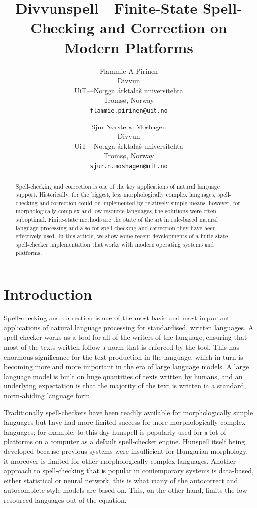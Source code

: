 \documentclass[free]{flammie}
\title{Divvunspell---Finite-State Spell-Checking and Correction on Modern Platforms}
\author{Flammie A Pirinen \\
  Divvun \\
  UiT---Norgga árktalaš universitehta \\
  Tromsø, Norway \\
  {\tt flammie.pirinen@uit.no} \\\and%
  Sjur Nørstebø Moshagen \\
  Divvun \\
  UiT---Norgga árktalaš universitehta \\
  Tromsø, Norway \\
  {\tt sjur.n.moshagen@uit.no}}
\date{}
\begin{document}
\maketitle
\begin{abstract}
    Spell-checking and correction is one of the key applications of natural
    language support.  Historically, for the biggest, less morphologically
    complex languages, spell-checking and correction could be implemented by
    relatively simple means; however, for morphologically complex and
    low-resource languages, the solutions were often suboptimal.  Finite-state
    methods are the state of the art in rule-based natural language processing
    and also for spell-checking and correction they have been effectively used.
    In this article, we show some recent developments of a finite-state
    spell-checker implementation that works with modern operating systems and
    platforms.
\end{abstract}



\section{Introduction}

Spell-checking and correction is one of the most basic and most important
applications of natural language processing for standardised, written languages.
A spell-checker works as a tool for all of the writers of the language, ensuring
that most of the texts written follow a norm that is enforced by the tool.  This
has enormous significance for the text production in the language, which in turn
is becoming more and more important in the era of large language models.  A
large language model is built on huge quantities of texts written by humans, and
an underlying expectation is that the majority of the text is written in a
standard, norm-abiding language form.

Traditionally spell-checkers have been readily available for morphologically
simple languages but have had more limited success for more morphologically
complex languages; for example, to this day hunspell is popularly used for a lot
of platforms on a computer as a default spell-checker engine. Hunspell itself
being developed because previous systems were insufficient for Hungarian
morphology, it moreover is limited for other morphologically complex languages.
Another approach to spell-checking that is popular in contemporary systems is
data-based, either statistical or neural network, this is what many of the
autocorrect and autocomplete style models are based on.  This, on the other
hand, limits the low-resourced languages out of the equation.
\end{document}
